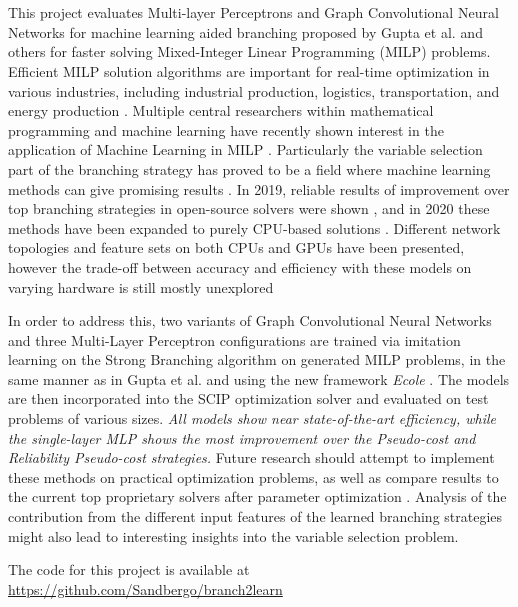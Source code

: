 \chapter*{\englishabstractname}
%
This project evaluates Multi-layer Perceptrons and Graph Convolutional Neural Networks for machine learning aided branching proposed by Gupta et al. \cite{gupta2020hybrid} and others
for faster solving Mixed-Integer Linear Programming (\gls{MILP}) problems. 
Efficient \gls{MILP} solution algorithms are important for real-time optimization in various industries, including industrial production, logistics, transportation, and energy production \cite{junger2010years}.  %
Multiple central researchers within mathematical programming and machine learning have recently shown interest in the application of Machine Learning in \gls{MILP} \cite{bengio2020machine,bertsimas2019online}. Particularly the variable selection part of the branching strategy has proved to be a field where machine learning methods can give promising results \cite{khalil2020towards}.
In 2019, reliable results of improvement over top branching strategies in open-source solvers were shown \cite{gasse2019exact}, and in 2020 these methods have been expanded to purely \gls{CPU}-based solutions \cite{gupta2020hybrid}. Different network topologies and feature sets on both \gls{CPU}s and \gls{GPU}s have been presented, however the trade-off between accuracy and efficiency with these models on varying hardware is still mostly unexplored  

In order to address this, two variants of Graph Convolutional Neural Networks and three Multi-Layer Perceptron configurations are trained via imitation learning on the Strong Branching algorithm on generated \gls{MILP} problems, in the same manner as in Gupta et al. \cite{gupta2020hybrid} and using the new framework \textit{Ecole} \cite{prouvost2020ecole}.  The models are then incorporated into the \gls{SCIP} optimization solver and evaluated on test problems of various sizes. \textit{All models show near state-of-the-art efficiency, while the single-layer \gls{MLP} shows the most improvement over the Pseudo-cost and Reliability Pseudo-cost strategies. }
Future research should attempt to implement these methods on practical optimization problems, as well as compare results to the current top proprietary solvers after parameter optimization \cite{hutter2010automated}. Analysis of the contribution from the different input features of the learned branching strategies might also lead to interesting insights into the variable selection problem. 

The code for this project is available at\\ \url{https://github.com/Sandbergo/branch2learn}
%
\clearpage
